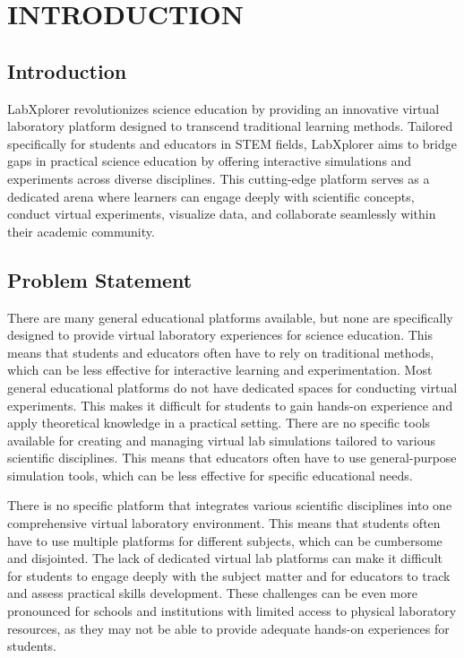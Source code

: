 \chapter{INTRODUCTION}



\section{Introduction}
LabXplorer revolutionizes science education by providing an innovative virtual laboratory platform designed to transcend traditional learning methods. Tailored specifically for students and educators in STEM fields, LabXplorer aims to bridge gaps in practical science education by offering interactive simulations and experiments across diverse disciplines. This cutting-edge platform serves as a dedicated arena where learners can engage deeply with scientific concepts, conduct virtual experiments, visualize data, and collaborate seamlessly within their academic community.


\section{Problem Statement}


There are many general educational platforms available, but none are specifically designed to provide virtual laboratory experiences for science education. This means that students and educators often have to rely on traditional methods, which can be less effective for interactive learning and experimentation. Most general educational platforms do not have dedicated spaces for conducting virtual experiments. This makes it difficult for students to gain hands-on experience and apply theoretical knowledge in a practical setting. There are no specific tools available for creating and managing virtual lab simulations tailored to various scientific disciplines. This means that educators often have to use general-purpose simulation tools, which can be less effective for specific educational needs.

There is no specific platform that integrates various scientific disciplines into one comprehensive virtual laboratory environment. This means that students often have to use multiple platforms for different subjects, which can be cumbersome and disjointed. The lack of dedicated virtual lab platforms can make it difficult for students to engage deeply with the subject matter and for educators to track and assess practical skills development. These challenges can be even more pronounced for schools and institutions with limited access to physical laboratory resources, as they may not be able to provide adequate hands-on experiences for students.
